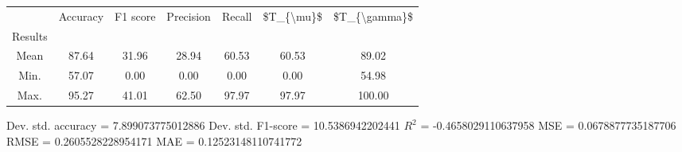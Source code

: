 \begin{tabular}{|c|c|c|c|c|c|c|}
\toprule
{} &  Accuracy &  F1 score &  Precision &  Recall &  \$T\_\{\textbackslash mu\}\$ &  \$T\_\{\textbackslash gamma\}\$ \\
Results &           &           &            &         &            &               \\
\hline
Mean    &     87.64 &     31.96 &      28.94 &   60.53 &      60.53 &         89.02 \\
Min.    &     57.07 &      0.00 &       0.00 &    0.00 &       0.00 &         54.98 \\
Max.    &     95.27 &     41.01 &      62.50 &   97.97 &      97.97 &        100.00 \\
\bottomrule
\end{tabular}

 Dev. std. accuracy = 7.899073775012886
 Dev. std. F1-score = 10.5386942202441
 $R^2$ = -0.4658029110637958
 MSE = 0.0678877735187706
 RMSE = 0.2605528228954171
 MAE = 0.12523148110741772